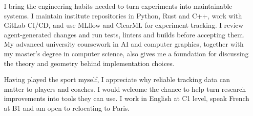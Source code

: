 {    I bring the engineering habits needed to turn experiments into maintainable systems. I maintain institute repositories in Python, Rust and C++, work with GitLab CI/CD, and use MLflow and ClearML for experiment tracking. I review agent-generated changes and run tests, linters and builds before accepting them. My advanced university coursework in AI and computer graphics, together with my master's degree in computer science, also gives me a foundation for discussing the theory and geometry behind implementation choices.

    Having played the sport myself, I appreciate why reliable tracking data can matter to players and coaches. I would welcome the chance to help turn research improvements into tools they can use. I work in English at C1 level, speak French at B1 and am open to relocating to Paris.

}
